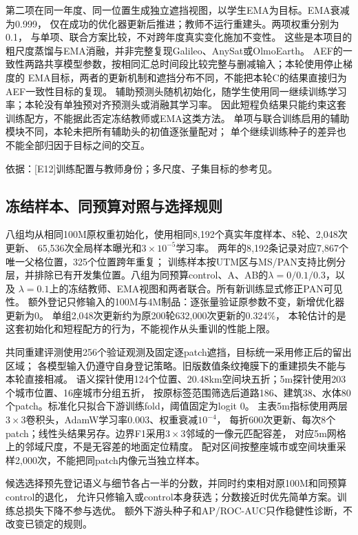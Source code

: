 \documentclass[UTF8,fontset=fandol,zihao=5,a4paper]{ctexart}
\newcommand{\source}[1]{\par{\footnotesize\color{muted}依据：#1}\par}
\begin{document}
第二项在同一年度、同一位置生成独立遮挡视图，以学生EMA为目标。EMA衰减为0.999，
仅在成功的优化器更新后推进；教师不运行重建头。两项权重分别为0.1，
与单项、联合方案比较，不对跨年度真实变化施加不变性。
这些是本项目的粗尺度蒸馏与EMA消融，并非完整复现Galileo、AnySat或OlmoEarth。
AEF的一致性两路共享模型参数，按相同汇总时间段比较完整与删减输入；本轮使用停止梯度的
EMA目标，两者的更新机制和遮挡分布不同，不能把本轮C的结果直接归为AEF一致性目标的复现。
辅助预测头随机初始化，随学生使用同一继续训练学习率；本轮没有单独预对齐预测头或消融其学习率。
因此短程负结果只能约束这套训练配方，不能据此否定冻结教师或EMA这类方法。
单项与联合训练启用的辅助模块不同，本轮未把所有辅助头的初值逐张量配对；
单个继续训练种子的差异也不能全部归因于目标之间的交互。
\source{[E12]训练配置与教师身份；多尺度、子集目标的参考见\cite{aef,galileo,anysat,tessera,olmoearth}。}

\subsection{冻结样本、同预算对照与选择规则}
八组均从相同100M原权重初始化，使用相同8{,}192个真实年度样本、8轮、2{,}048次更新、
65{,}536次全局样本曝光和$3\times10^{-5}$学习率。
两年的8{,}192条记录对应7{,}867个唯一父格位置，325个位置跨年重复；
训练样本按UTM区与MS/PAN支持比例分层，并排除已有开发集位置。八组为同预算control、A、AB的$\lambda=0/0.1/0.3$，以及
$\lambda=0.1$上的冻结教师、EMA视图和两者联合。所有新训练显式修正PAN可见性。
额外登记只修输入的100M与4M制品：逐张量验证原参数不变，新增优化器更新为0。
单组2{,}048次更新约为原200轮632{,}000次更新的0.324\%，
本轮估计的是这套初始化和短程配方的行为，不能视作从头重训的性能上限。

共同重建评测使用256个验证观测及固定逐patch遮挡，目标统一采用修正后的留出区域；
各模型输入仍遵守自身登记策略。旧版数值条纹掩膜下的重建损失不能与本轮直接相减。
语义探针使用124个位置、20.48km空间块五折；5m探针使用203个城市位置、16座城市分组五折，
按原标签范围筛选后道路186、建筑38、水体80个patch。标准化只拟合下游训练fold，阈值固定为logit 0。
主表5m指标使用两层$3\times3$卷积头，AdamW学习率0.003、权重衰减$10^{-4}$，
每折600次更新、每次8个patch；线性头结果另存。边界F1采用$3\times3$邻域的一像元匹配容差，
对应5m网格上的邻域尺度，不是无容差的地面定位精度。
配对区间按整座城市或空间块重采样2{,}000次，不能把同patch内像元当独立样本。

候选选择预先登记语义与细节各占一半的分数，并同时约束相对原100M和同预算control的退化，
允许只修输入或control本身获选；分数接近时优先简单方案。训练总损失下降不参与选优。
额外下游头种子和AP/ROC-AUC只作稳健性诊断，不改变已锁定的规则。
\end{document}
